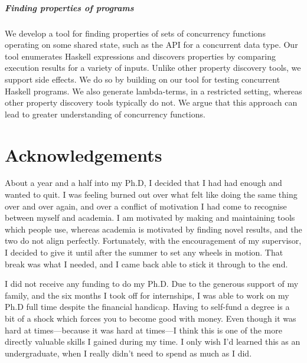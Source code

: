 \paragraph{Finding properties of programs}
We develop a tool for finding properties of sets of concurrency
functions operating on some shared state, such as the API for a
concurrent data type.  Our tool enumerates Haskell expressions and
discovers properties by comparing execution results for a variety of
inputs.  Unlike other property discovery tools, we support side
effects.  We do so by building on our tool for testing concurrent
Haskell programs.  We also generate lambda-terms, in a restricted
setting, whereas other property discovery tools typically do not.  We
argue that this approach can lead to greater understanding of
concurrency functions.

\makeatletter\renewcommand{}\makeatother
\tableofcontents
\listoffigures
\listoftables
\listoflistings

\chapter*{Acknowledgements}

About a year and a half into my Ph.D, I decided that I had had enough
and wanted to quit.  I was feeling burned out over what felt like
doing the same thing over and over again, and over a conflict of
motivation I had come to recognise between myself and academia.  I am
motivated by making and maintaining tools which people use, whereas
academia is motivated by finding novel results, and the two do not
align perfectly.  Fortunately, with the encouragement of my
supervisor, I decided to give it until after the summer to set any
wheels in motion.  That break was what I needed, and I came back able
to stick it through to the end.

I did not receive any funding to do my Ph.D.  Due to the generous
support of my family, and the six months I took off for internships, I
was able to work on my Ph.D full time despite the financial handicap.
Having to self-fund a degree is a bit of a shock which forces you to
become good with money.  Even though it was hard at times---because it
was hard at times---I think this is one of the more directly valuable
skills I gained during my time.  I only wish I'd learned this as an
undergraduate, when I really didn't need to spend as much as I did.


